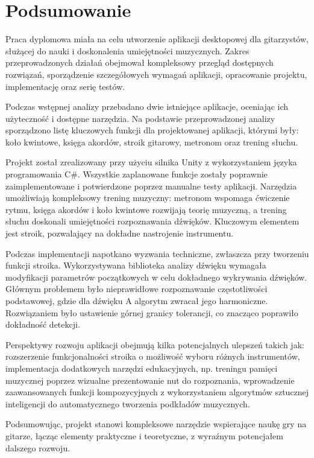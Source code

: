 \chapter{Podsumowanie}

Praca dyplomowa miała na celu utworzenie aplikacji desktopowej dla gitarzystów, służącej do nauki i doskonalenia umiejętności muzycznych. Zakres przeprowadzonych działań obejmował kompleksowy przegląd dostępnych rozwiązań, sporządzenie szczegółowych wymagań aplikacji, opracowanie projektu, implementację oraz serię testów.

Podczas wstępnej analizy przebadano dwie istniejące aplikacje, oceniając ich użyteczność i dostępne narzędzia. Na podstawie przeprowadzonej analizy sporządzono listę kluczowych funkcji dla projektowanej aplikacji, którymi były: koło kwintowe, księga akordów, stroik gitarowy, metronom oraz trening słuchu.

Projekt został zrealizowany przy użyciu silnika Unity z wykorzystaniem języka programowania C\#. Wszystkie zaplanowane funkcje zostały poprawnie zaimplementowane i potwierdzone poprzez manualne testy aplikacji. Narzędzia umożliwiają kompleksowy trening muzyczny: metronom wspomaga ćwiczenie rytmu, księga akordów i koło kwintowe rozwijają teorię muzyczną, a trening słuchu doskonali umiejętności rozpoznawania dźwięków. Kluczowym elementem jest stroik, pozwalający na dokładne nastrojenie instrumentu.

Podczas implementacji napotkano wyzwania techniczne, zwłaszcza przy tworzeniu funkcji stroika. Wykorzystywana biblioteka analizy dźwięku wymagała modyfikacji parametrów początkowych w celu dokładnego wykrywania dźwięków. Głównym problemem było nieprawidłowe rozpoznawanie częstotliwości podstawowej, gdzie dla dźwięku A algorytm zwracał jego harmoniczne. Rozwiązaniem było ustawienie górnej granicy tolerancji, co znacząco poprawiło dokładność detekcji.

Perspektywy rozwoju aplikacji obejmują kilka potencjalnych ulepszeń takich jak: rozszerzenie funkcjonalności stroika o możliwość wyboru różnych instrumentów, implementacja dodatkowych narzędzi edukacyjnych, np. treningu pamięci muzycznej poprzez wizualne prezentowanie nut do rozpoznania, wprowadzenie zaawansowanych funkcji kompozycyjnych z wykorzystaniem algorytmów sztucznej inteligencji do automatycznego tworzenia podkładów muzycznych.

Podsumowując, projekt stanowi kompleksowe narzędzie wspierające naukę gry na gitarze, łącząc elementy praktyczne i teoretyczne, z wyraźnym potencjałem dalszego rozwoju.
